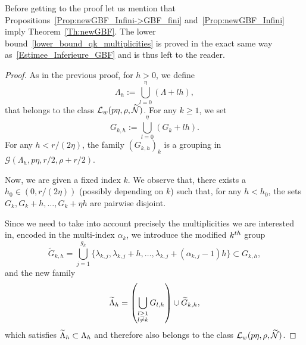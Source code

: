 \documentclass[11pt]{article}
\theoremstyle{definition}
\numberwithin{equation}{section}
\numberwithin{figure}{section}
\numberwithin{table}{section}
\newcommand{\n}{g}
\newcommand{\LL}{\mathcal{L}}
\newcommand{\NN}{\mathcal{N}}
\let\oldtilde\tilde
\renewcommand*{\tilde}[1]{\mathchoice{\widetilde{#1}}{\widetilde{#1}}{\oldtilde{#1}}{\oldtilde{#1}}}\let\oldexists\exists
\renewcommand*{\exists}{\mathrel{\oldexists}}
\begin{document}
Before getting to the proof let us mention that Propositions~\ref{Prop:newGBF_Infini->GBF_fini} and~\ref{Prop:newGBF_Infini} imply Theorem~\ref{Th:newGBF}. The lower bound~\eqref{lower_bound_qk_multiplicities} is proved in the exact same way as~\eqref{Estimee_Inferieure_GBF} and is thus left to the reader.
\begin{proof}
As in the previous proof, for $h>0$, we define
\[
\Lambda_h :=\bigcup_{l=0}^{\eta} (\Lambda + l h),
\]
that belongs to the class $\LL_w(p\eta,\rho,\tilde{\NN})$. For any $k \geq 1$, we set
\[
G_{k,h} := \bigcup_{l=0}^{\eta} (G_k + l h).
\]
For any $h<r/(2\eta)$, the family $(G_{k,h})_k$ is a grouping in $\mathcal{G}(\Lambda_h, p\eta,r/2,\rho+r/2)$.

Now, we are given a fixed index $k$. We observe that, there exists a $h_0\in(0,r/(2\eta))$ (possibly depending on $k$) such that, for any $h<h_0$, the sets $G_k, G_k+h, \dotsc, G_k+\eta h$ are pairwise disjoint.

Since we need to take into account precisely the multiplicities we are interested in, encoded in the multi-index $\alpha_k$, we introduce the modified $k^{\rm th}$ group
\goodbreak
\begingroup
\[
\widetilde{G}_{k,h} = \bigcup_{j=1}^{\n_k} \{\lambda_{k,j}, \lambda_{k,j} +h, \dotsc,\lambda_{k,j}+(\alpha_{k,j}-1) h \} \subset G_{k,h},
\]
and the new family
\[
\tilde{\Lambda}_h = \left(\bigcup_{\substack{l\geq 1\\l\neq k}} G_{l,h} \right) \cup \widetilde{G}_{k,h},
\]
\endgroup
which satisfies $\tilde{\Lambda}_h\subset \Lambda_h$ and therefore also belongs to the class $\LL_w(p\eta,\rho,\tilde{\NN})$.


\end{proof}
\end{document}
